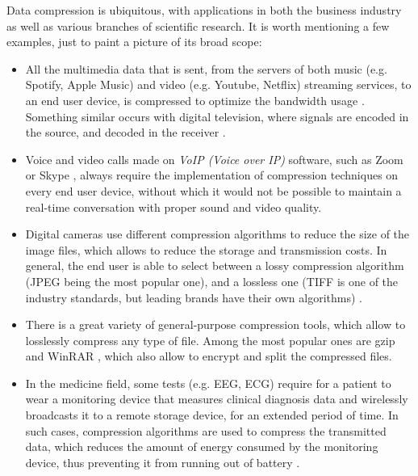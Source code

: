 Data compression is ubiquitous, with applications in both the business industry as well as various branches of scientific research. It is worth mentioning a few examples, just to paint a picture of its broad scope:
\vspace{-5pt}
\begin{itemize}
\item All the multimedia data that is sent, from the servers of both music (e.g. Spotify, Apple Music) and video (e.g. Youtube, Netflix) streaming services, to an end user device, is compressed to optimize the bandwidth usage \cite{SpotifyApple, HEVC}. Something similar occurs with digital television, where signals are encoded in the source, and decoded in the receiver \cite{DTV}.

\item Voice and video calls made on \textit{VoIP (Voice over IP)} software, such as Zoom \cite{Zoom} or Skype \cite{Skype}, always require the implementation of compression techniques on every end user device, without which it would not be possible to maintain a real-time conversation with proper sound and video quality.

\item Digital cameras use different compression algorithms to reduce the size of the image files, which allows to reduce the storage and transmission costs. In general, the end user is able to select between a lossy compression algorithm (JPEG being the most popular one), and a lossless one (TIFF is one of the industry standards, but leading brands have their own algorithms) \cite{Nikon, Canon}. 

\item There is a great variety of general-purpose compression tools, which allow to losslessly compress any type of file. Among the most popular ones are gzip \cite{gzip} and WinRAR \cite{WinRAR}, which also allow to encrypt and split the compressed files. 

\item In the medicine field, some tests (e.g. EEG, ECG) require for a patient to wear a monitoring device that measures clinical diagnosis data and wirelessly broadcasts it to a remote storage device, for an extended period of time. In such cases, compression algorithms are used to compress the transmitted data, which reduces the amount of energy consumed by the monitoring device,
thus preventing it from running out of battery \cite{EEG, ECG}.


\end{itemize}
